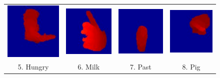 \documentclass[final,3p,times,twocolumn]{elsarticle}
\begin{document}
\begin{figure}[H]
{\begin{tabular}{cccc}
		         \includegraphics[width=0.22\columnwidth]{Figures/MSRGesture3D_hungry.pdf} &          \includegraphics[width=0.22\columnwidth]{Figures/MSRGesture3D_milk.pdf} &          \includegraphics[width=0.22\columnwidth]{Figures/MSRGesture3D_past.pdf} &          \includegraphics[width=0.22\columnwidth]{Figures/MSRGesture3D_pig.pdf} \\
		
		         5. Hungry &          6. Milk &          7. Past &          8. Pig \\
		

\end{tabular}}
\end{figure}
\end{document}
